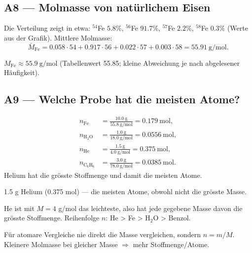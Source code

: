 
\subsection*{A8 --- Molmasse von natürlichem Eisen}
Die Verteilung zeigt in etwa: ${}^{54}$Fe $5.8\%$, ${}^{56}$Fe $91.7\%$,
${}^{57}$Fe $2.2\%$, ${}^{58}$Fe $0.3\%$ (Werte aus der Grafik). Mittlere
Molmasse:
\begin{equation}
  \bar M_{\mathrm{Fe}} = 0.058\cdot54 + 0.917\cdot56 + 0.022\cdot57
  + 0.003\cdot58 = 55.91\ \mathrm{g/mol}.
\end{equation}

\begin{ergebnis}
$M_{\mathrm{Fe}} \approx 55.9\ \mathrm{g/mol}$ (Tabellenwert 55.85; kleine
Abweichung je nach abgelesener Häufigkeit).
\end{ergebnis}

\subsection*{A9 --- Welche Probe hat die meisten Atome?}
\begin{align}
  n_{\mathrm{Fe}}  &= \tfrac{10.0\ \mathrm{g}}{55.8\ \mathrm{g/mol}} = 0.179\ \mathrm{mol},\\
  n_{\mathrm{H_2O}} &= \tfrac{1.0\ \mathrm{g}}{18.0\ \mathrm{g/mol}} = 0.0556\ \mathrm{mol},\\
  n_{\mathrm{He}}  &= \tfrac{1.5\ \mathrm{g}}{4.0\ \mathrm{g/mol}} = 0.375\ \mathrm{mol},\\
  n_{\mathrm{C_6H_6}} &= \tfrac{3.0\ \mathrm{g}}{78.0\ \mathrm{g/mol}} = 0.0385\ \mathrm{mol}.
\end{align}
Helium hat die grösste Stoffmenge und damit die meisten Atome.

\begin{ergebnis}
1.5 g Helium (0.375 mol) --- die meisten Atome, obwohl nicht die grösste Masse.
\end{ergebnis}

\begin{kontrolle}
He ist mit $M=4$ g/mol das leichteste, also hat jede gegebene Masse davon die
grösste Stoffmenge. Reihenfolge $n$: He > Fe > H$_2$O > Benzol.
\end{kontrolle}

\begin{merksatz}
Für atomare Vergleiche nie direkt die Masse vergleichen, sondern $n=m/M$.
Kleinere Molmasse bei gleicher Masse $\Rightarrow$ mehr Stoffmenge/Atome.
\end{merksatz}
